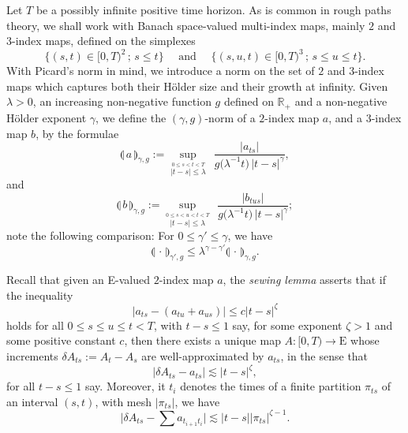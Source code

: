 \documentclass[11pt,a4paper]{amsart}
\newcommand{\RR}{\mathbb{R}}  \newcommand{\CC}{\mathbb{C}}  \newcommand{\LL}{\mathbb{L}}  \newcommand{\WW}{\mathbb{W}}
\renewcommand{\leq}{\leqslant}
\newcommand{\ssk}{\smallskip}
\numberwithin{equation}{section} %
\begin{document}
\medskip

Let $T$ be a possibly infinite positive time horizon. As is common in rough paths theory, we shall work with Banach space-valued multi-index maps, mainly $2$ and $3$-index maps, defined on the simplexes
$$
\Big\{(s,t)\in [0,T)^2\,;\,s\leq t\Big\}\quad \textrm{ and } \quad \Big\{(s,u,t)\in [0,T)^3\,;\,s\leq u\leq t\Big\}.
$$
With Picard's norm in mind, we introduce a norm on the set of $2$ and $3$-index maps which captures both their H\"older size and their growth at infinity. 
Given $\lambda >0$, an increasing non-negative function $g$ defined on $\RR_+$ and a non-negative H\"older exponent $\gamma$, we define the $(\gamma,g)$-norm of a $2$-index map $a$, and a $3$-index map $b$, by the formulae
$$
\llparenthesis\, a \,\rrparenthesis_{\gamma,g} := \underset{\stackrel{0\leq s<t<T}{|t-s|\le \lambda}}{\sup}\;\,\frac{\big| a_{ts}\big|}{g\big(\lambda^{-1} t\big)\,|t-s|^\gamma},
$$
and 
$$
\llparenthesis\, b \,\rrparenthesis_{\gamma,g} := \underset{\stackrel{0\leq s< u<t<T}{{|t-s|\le \lambda}}}{\sup}\;\,\frac{\big| b_{tus}\big|}{g\big(\lambda^{-1} t\big)\,|t-s|^\gamma};
$$
note the following comparison: For $0\leq \gamma'\leq \gamma$, we have
\begin{equation}
\label{EqComparisonNorms}
\llparenthesis\, \cdot \,\rrparenthesis_{\gamma',g} \leq \lambda^{\gamma-\gamma'} \llparenthesis\, \cdot \,\rrparenthesis_{\gamma,g}.
\end{equation}

\ssk

Recall that given an E-valued $2$-index map $a$, the \textit{sewing lemma} \cite{Gubinelli04, FdlP} asserts that if the inequality
\begin{equation}
\label{EqAlmostAdditivity}
\big| a_{ts} - (a_{tu}+a_{us})\big| \leq c|t-s|^\zeta
\end{equation}
holds for all $0\leq s\leq u\leq t<T$, with $t-s\leq 1$ say, for some exponent $\zeta>1$ and some positive constant $c$, then there exists a unique map $A : [0,T)\rightarrow \textrm{E}$ whose increments $\delta A_{ts} := A_t-A_s$ are well-approximated by $a_{ts}$, in the sense that 
$$
\big|\delta A_{ts} - a_{ts} \big| \lesssim |t-s|^\zeta,
$$
for all $t-s\leq 1$ say. Moreover, it $t_i$ denotes the times of a finite partition $\pi_{ts}$ of an interval $(s,t)$, with mesh $\big|\pi_{ts}\big|$, we have
\begin{equation}
\label{EqEstimateAlmostAdditiveFunctional}
\big|\delta A_{ts} - \sum a_{t_{i+1}t_i}\big| \lesssim |t-s|\big|\pi_{ts}\big|^{\zeta-1}.
\end{equation}
\end{document}
